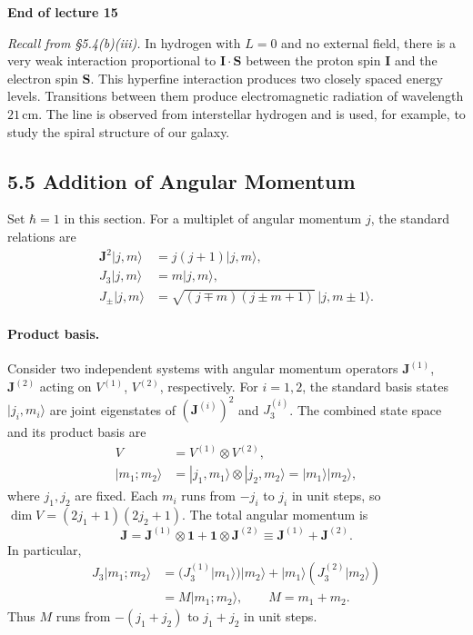 \documentclass[11pt,a4paper]{article}
\begin{document}
\begin{center}
    \textbf{End of lecture 15}
\end{center}

\noindent\textit{Recall from \S5.4(b)(iii).}
In hydrogen with $L=0$ and no external field, there is a very weak
interaction proportional to $\mathbf I\cdot\mathbf S$ between the proton
spin $\mathbf I$ and the electron spin $\mathbf S$. This hyperfine
interaction produces two closely spaced energy levels. Transitions
between them produce electromagnetic radiation of wavelength
$21\,\mathrm{cm}$. The line is observed from interstellar hydrogen
and is used, for example, to study the spiral structure of our galaxy.

\subsection*{5.5 Addition of Angular Momentum}

Set $\hbar=1$ in this section. For a multiplet of angular momentum $j$,
the standard relations are
\begin{align*}
    \mathbf J^2|j,m\rangle &= j(j+1)|j,m\rangle,\\
    J_3|j,m\rangle &= m|j,m\rangle,\\
    J_\pm|j,m\rangle &=
        \sqrt{(j\mp m)(j\pm m+1)}\,|j,m\pm1\rangle.
\end{align*}

\paragraph{Product basis.}
Consider two independent systems with angular momentum operators
$\mathbf J^{(1)}$, $\mathbf J^{(2)}$ acting on $V^{(1)}$, $V^{(2)}$,
respectively. For $i=1,2$, the standard basis states $|j_i,m_i\rangle$
are joint eigenstates of $(\mathbf J^{(i)})^2$ and $J_3^{(i)}$.
The combined state space and its product basis are
\begin{align*}
    V &= V^{(1)}\otimes V^{(2)},\\
    |m_1;m_2\rangle &=
        |j_1,m_1\rangle\otimes|j_2,m_2\rangle
        = |m_1\rangle|m_2\rangle,
\end{align*}
where $j_1,j_2$ are fixed. Each $m_i$ runs from $-j_i$ to $j_i$
in unit steps, so $\dim V=(2j_1+1)(2j_2+1)$. The total angular momentum is
\[
    \mathbf J = \mathbf J^{(1)}\otimes\mathbf 1
                  + \mathbf 1\otimes\mathbf J^{(2)}
              \equiv \mathbf J^{(1)}+\mathbf J^{(2)}.
\]
In particular,
\begin{align*}
    J_3|m_1;m_2\rangle
    &= (J_3^{(1)}|m_1\rangle)|m_2\rangle
       + |m_1\rangle(J_3^{(2)}|m_2\rangle)\\
    &= M|m_1;m_2\rangle,\qquad M=m_1+m_2.
\end{align*}
Thus $M$ runs from $-(j_1+j_2)$ to $j_1+j_2$ in unit steps.
\end{document}
